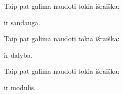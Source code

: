 \documentclass[letterpaper,10pt,lithuanian]{sphinxmanual}
\begin{document}

\begin{fulllineitems}
\label{\detokenize{formules:func.mul}}
\pysigstartsignatures
{}
\pysigstopsignatures
\sphinxAtStartPar
Taip pat galima naudoti tokia išraiška:

\begin{sphinxVerbatim}[commandchars=\\\{\}]
  
\end{sphinxVerbatim}

\sphinxAtStartPar
{} ir  sandauga.

\end{fulllineitems}


\begin{fulllineitems}
\label{\detokenize{formules:func.div}}
\pysigstartsignatures
{}
\pysigstopsignatures
\sphinxAtStartPar
Taip pat galima naudoti tokia išraiška:

\begin{sphinxVerbatim}[commandchars=\\\{\}]
  
\end{sphinxVerbatim}

\sphinxAtStartPar
{} ir  dalyba.

\end{fulllineitems}


\begin{fulllineitems}
\label{\detokenize{formules:func.mod}}
\pysigstartsignatures
{}
\pysigstopsignatures
\sphinxAtStartPar
Taip pat galima naudoti tokia išraiška:

\begin{sphinxVerbatim}[commandchars=\\\{\}]
  
\end{sphinxVerbatim}

\sphinxAtStartPar
{} ir  modulis.

\end{fulllineitems}
\end{document}
